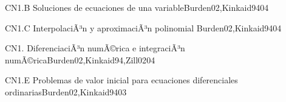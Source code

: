 \begin{syllabus}
\begin{unit}{CN1.B Soluciones de ecuaciones de una variable}{Burden02,Kinkaid94}{0}{4}
\begin{topics}
      \item \CNONETopicIterative
   \end{topics}
   \begin{learningoutcomes}
      \item \CNONEObjONE
      \item \CNONEObjTWO
      \item \CNONEObjTHREE
      \item \CNONEObjFOUR
   \end{learningoutcomes}
\end{unit}

\begin{unit}{CN1.C InterpolaciÃ³n y aproximaciÃ³n polinomial }{Burden02,Kinkaid94}{0}{4}
\begin{topics}
      \item \CNONETopicCurve
   \end{topics}

   \begin{learningoutcomes}
      \item \CNONEObjONE
      \item \CNONEObjTWO
      \item \CNONEObjTHREE
      \item \CNONEObjFOUR
   \end{learningoutcomes}
\end{unit}

\begin{unit}{CN1. DiferenciaciÃ³n numÃ©rica e integraciÃ³n numÃ©rica}{Burden02,Kinkaid94,Zill02}{0}{4}
\begin{topics}
      \item \CNONETopicNumerical
      \item \CNONETopicExplicit
   \end{topics}

   \begin{learningoutcomes}
      \item \CNONEObjONE
      \item \CNONEObjTWO
      \item \CNONEObjTHREE
      \item \CNONEObjFOUR
   \end{learningoutcomes}
\end{unit}

\begin{unit}{CN1.E Problemas de valor inicial para ecuaciones diferenciales ordinarias}{Burden02,Kinkaid94}{0}{3}
\begin{topics}
      \item \CNONETopicDifferential
   \end{topics}


\end{unit}
\end{syllabus}
